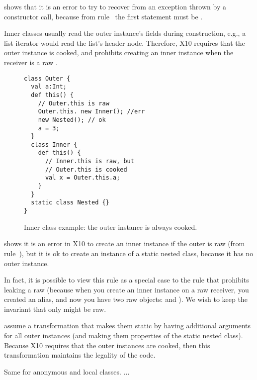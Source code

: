  shows that it is an error to try to recover from an exception thrown
    by a constructor call, because from rule~ the first statement must be .


Inner classes usually read the outer instance's fields during construction,
    e.g., a list iterator would read the list's header node.
Therefore, X10 requires that the outer instance is cooked,
    and prohibits creating an inner instance when the receiver is a raw \this.


\begin{figure}
\begin{lstlisting}
class Outer {
  val a:Int;
  def this() {
    // Outer.this is raw
    Outer.this. new Inner(); //err
    new Nested(); // ok
    a = 3;
  }
  class Inner {
    def this() {
      // Inner.this is raw, but
      // Outer.this is cooked
      val x = Outer.this.a;
    }
  }
  static class Nested {}
}
\end{lstlisting}
\caption{Inner class example: the outer instance is always cooked.
    }
\label{Figure:InnerClass}
\end{figure}

 shows it is an error in X10 to create an inner instance
    if the outer is raw (from rule~),
    but it is ok to create an instance of a static nested class,
    because it has no outer instance.

In fact, it is possible to view this rule as a special case to the rule that
    prohibits leaking a raw \this
    (because when you create an inner instance on a raw \this receiver,
    you created an alias,
    and now you have two raw objects:  and ).
We wish to keep the invariant that only \this might be raw.


assume a transformation that makes them static by having additional arguments for all outer instances (and making them properties of the static nested class).
Because X10 requires that the outer instances are cooked, then this transformation maintains the legality of the code.

Same for anonymous and local classes. \todo ...



